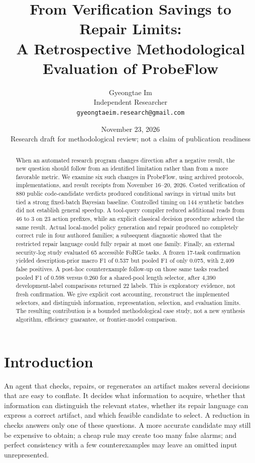 \documentclass[10pt,twocolumn,letterpaper]{article}
\title{From Verification Savings to Repair Limits:\\A Retrospective Methodological Evaluation of ProbeFlow}
\author{Gyeongtae Im\\Independent Researcher\\\texttt{gyeongtaeim.research@gmail.com}}
\date{November 23, 2026\\\small Research draft for methodological review; not a claim of publication readiness}
\begin{document}
\maketitle
\begin{abstract}
When an automated research program changes direction after a negative result, the new question should follow from an identified limitation rather than from a more favorable metric. We examine six such changes in ProbeFlow, using archived protocols, implementations, and result receipts from November 16--20, 2026. Costed verification of 880 public code-candidate verdicts produced conditional savings in virtual units but tied a strong fixed-batch Bayesian baseline. Controlled timing on 144 synthetic batches did not establish general speedup. A tool-query compiler reduced additional reads from 46 to 3 on 23 action prefixes, while an explicit classical decision procedure achieved the same result. Actual local-model policy generation and repair produced no completely correct rule in four authored families; a subsequent diagnostic showed that the restricted repair language could fully repair at most one family. Finally, an external security-log study evaluated 65 accessible FoRGe tasks. A frozen 17-task confirmation yielded description-prior macro F1 of 0.537 but pooled F1 of only 0.075, with 2,409 false positives. A post-hoc counterexample follow-up on those same tasks reached pooled F1 of 0.598 versus 0.260 for a shared-pool length selector, after 4,390 development-label comparisons returned 22 labels. This is exploratory evidence, not fresh confirmation. We give explicit cost accounting, reconstruct the implemented selectors, and distinguish information, representation, selection, and evaluation limits. The resulting contribution is a bounded methodological case study, not a new synthesis algorithm, efficiency guarantee, or frontier-model comparison.
\end{abstract}

\section{Introduction}
An agent that checks, repairs, or regenerates an artifact makes several decisions that are easy to conflate. It decides what information to acquire, whether that information can distinguish the relevant states, whether its repair language can express a correct artifact, and which feasible candidate to select. A reduction in checks answers only one of these questions. A more accurate candidate may still be expensive to obtain; a cheap rule may create too many false alarms; and perfect consistency with a few counterexamples may leave an omitted input unrepresented.
\end{document}
